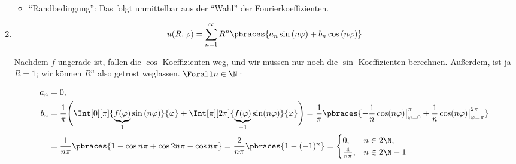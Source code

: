 \begin{solution}
\begin{enumerate}[label = (\roman*)]
\begin{itemize}
        \item \enquote{Randbedingung}:
        Das folgt unmittelbar aus der \enquote{Wahl} der Fourierkoeffizienten.

    \end{itemize}

    \item

    \begin{align*}
        u(R, \varphi)
        =
        \sum_{n=1}^\infty
        R^n
        \pbraces
        {
            a_n \sin{(n\varphi)}
            +
            b_n \cos{(n\varphi)}
        }
    \end{align*}

    Nachdem $f$ ungerade ist, fallen die $\cos$-Koeffizienten weg, und wir müssen nur noch die $\sin$-Koeffizienten berechnen.
    Außerdem, ist ja $R = 1$; wir können $R^n$ also getrost weglassen.
    $\Forall n \in \N:$

    \begin{align*}
        a_n & = 0, \\
        b_n
        & =
        \frac{1}{\pi}
        \Bigg (
            \Int[0][\pi]
            {
                \underbrace{f(\varphi)}_1
                \sin{(n \varphi)}
            }{\varphi}
            +
            \Int[\pi][2 \pi]
            {
                \underbrace{f(\varphi)}_{-1}
                \sin(n \varphi)
            }{\varphi}
        \Bigg )
        =
        \frac{1}{\pi}
        \pbraces
        {
            -\frac{1}{n}
            \cos(n \varphi)
            \big |_{\varphi = 0}^\pi
            +
            \frac{1}{n}
            \cos(n \varphi)
            \big |_{\varphi = \pi}^{2 \pi}
        } \\
        & =
        \frac{1}{n \pi}
        \pbraces
        {
            1 - \cos{n \pi}
            +
            \cos{2n \pi} - \cos{n \pi}
        }
        =
        \frac{2}{n \pi}
        \pbraces
        {
            1 - (-1)^n
        }
        =
        \begin{cases}
            0,               & n \in 2 \N, \\
            \frac{4}{n \pi}, & n \in 2 \N - 1
        \end{cases}
    \end{align*}

\end{enumerate}



\end{solution}

